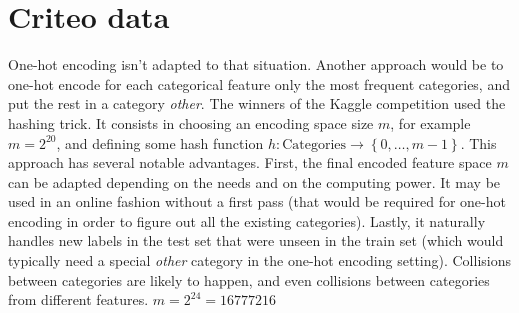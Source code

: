 \section{Criteo data}\label{sec:criteo_data}

One-hot encoding isn't adapted to that situation.
Another approach would be to one-hot encode for each categorical feature only the most frequent categories,
and put the rest in a category \textit{other}.
The winners of the Kaggle competition used the hashing trick.
It consists in choosing an encoding space size $m$,
for example $m = 2^{20}$,
and defining some hash function $h \colon \text{Categories} \to \left\{ 0, \dots, m - 1 \right\}$.
This approach has several notable advantages.
First, the final encoded feature space $m$ can be adapted depending on the needs and on the computing power.
It may be used in an online fashion without a first pass
(that would be required for one-hot encoding in order to figure out all the existing categories).
Lastly, it naturally handles new labels in the test set that were unseen in the train set
(which would typically need a special \textit{other} category in the one-hot encoding setting).
Collisions between categories are likely to happen,
and even collisions between categories from different features.
$m = 2^{24} = 16777216$
